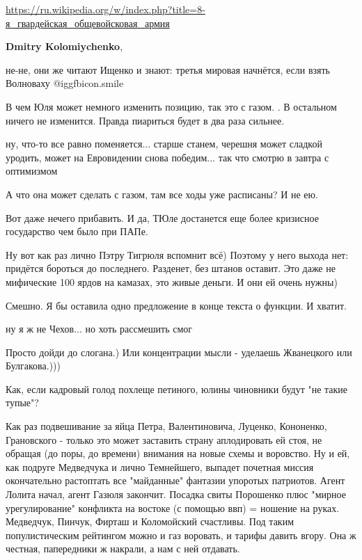 \begin{itemize}
\begin{itemize}
\url{https://ru.wikipedia.org/w/index.php?title=8-я_гвардейская_общевойсковая_армия}

\textbf{Dmitry Kolomiychenko}, 

не-не, они же читают Ищенко и знают: третья мировая начнётся, если взять
Волноваху  @igg{fbicon.smile} 

\end{itemize} %


В чем Юля может немного изменить позицию, так это с газом. . В остальном ничего
не изменится. Правда пиариться будет в два раза сильнее.

\begin{itemize} %

ну, что-то все равно поменяется... старше станем, черешня может сладкой
уродить, может на Евровидении снова победим... так что смотрю в завтра с
оптимизмом

А что она может сделать с газом, там все ходы уже расписаны? И не ею.
\end{itemize} %

Вот даже нечего прибавить. И да, ТЮле достанется еще более кризисное государство чем было при ПАПе.


Ну вот как раз лично Пэтру Тигрюля вспомнит всё) Поэтому у него выхода нет:
придётся бороться до последнего. Разденет, без штанов оставит. Это даже не
мифические 100 ярдов на камазах, это живые деньги. И они ей очень нужны)

Смешно. Я бы оставила одно предложение в конце текста о функции. И хватит.

\begin{itemize} %
ну я ж не Чехов... но хоть рассмешить смог

Просто дойди до слогана.) Или концентрации мысли - уделаешь Жванецкого или Булгакова.)))
\end{itemize} %


Как, если кадровый голод похлеще петиного, юлины чиновники будут "не такие тупые"?

Как раз подвешивание за яйца Петра, Валентиновича, Луценко, Кононенко,
Грановского - только это может заставить страну аплодировать ей стоя, не
обращая (до поры, до времени) внимания на новые схемы и воровство. Ну и ей, как
подруге Медведчука и лично Темнейшего, выпадет почетная миссия окончательно
растоптать все "майданные" фантазии упоротых патриотов. Агент Лолита начал,
агент Газюля закончит. Посадка свиты Порошенко плюс "мирное урегулирование"
конфликта на востоке (с помощью ввп) = ношение на руках. Медведчук, Пинчук,
Фирташ и Коломойский счастливы. Под таким популистическим рейтингом можно и газ
воровать, и тарифы давить вгору. Она ж честная, папередники ж накрали, а нам с
ней отдавать.


\end{itemize}

